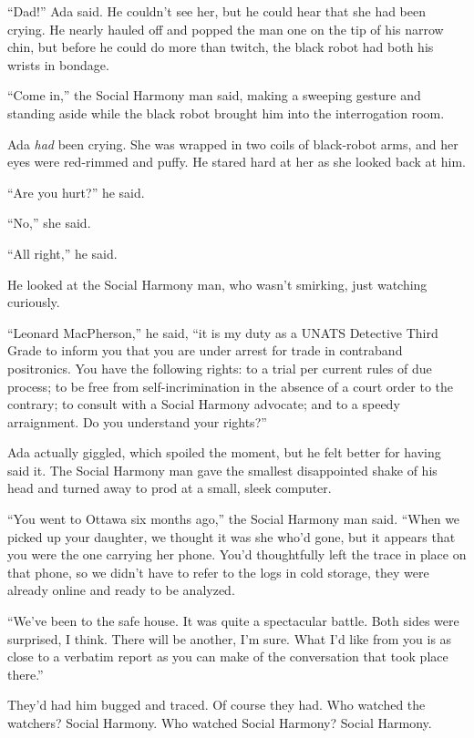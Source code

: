 “Dad!” Ada said. He couldn’t see her, but he could hear that she
had been crying. He nearly hauled off and popped the man one on the
tip of his narrow chin, but before he could do more than twitch,
the black robot had both his wrists in bondage.

“Come in,” the Social Harmony man said, making a sweeping gesture
and standing aside while the black robot brought him into the
interrogation room.

\tb

Ada \emph{had} been crying. She was wrapped in two coils of
black-robot arms, and her eyes were red-rimmed and puffy. He stared
hard at her as she looked back at him.

“Are you hurt?” he said.

“No,” she said.

“All right,” he said.

He looked at the Social Harmony man, who wasn’t smirking, just
watching curiously.

“Leonard MacPherson,” he said, “it is my duty as a UNATS Detective
Third Grade to inform you that you are under arrest for trade in
contraband positronics. You have the following rights: to a trial
per current rules of due process; to be free from
self-incrimination in the absence of a court order to the contrary;
to consult with a Social Harmony advocate; and to a speedy
arraignment. Do you understand your rights?”

Ada actually giggled, which spoiled the moment, but he felt better
for having said it. The Social Harmony man gave the smallest
disappointed shake of his head and turned away to prod at a small,
sleek computer.

“You went to Ottawa six months ago,” the Social Harmony man said.
“When we picked up your daughter, we thought it was she who’d gone,
but it appears that you were the one carrying her phone. You’d
thoughtfully left the trace in place on that phone, so we didn’t
have to refer to the logs in cold storage, they were already online
and ready to be analyzed.

“We’ve been to the safe house. It was quite a spectacular battle.
Both sides were surprised, I think. There will be another, I’m
sure. What I’d like from you is as close to a verbatim report as
you can make of the conversation that took place there.”

They’d had him bugged and traced. Of course they had. Who watched
the watchers? Social Harmony. Who watched Social Harmony? Social
Harmony.

